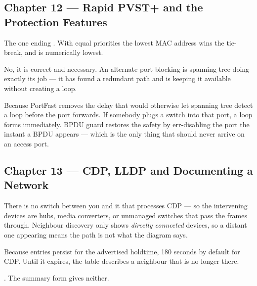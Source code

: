 \subsection*{Chapter 12 --- Rapid PVST+ and the Protection Features}
\begin{tightnum}
  \item The one ending . With equal priorities the lowest MAC address
        wins the tie-break, and  is numerically lowest.
  \item No, it is correct and necessary. An alternate port blocking is spanning
        tree doing exactly its job --- it has found a redundant path and is
        keeping it available without creating a loop.
  \item Because PortFast removes the delay that would otherwise let spanning tree
        detect a loop before the port forwards. If somebody plugs a switch into
        that port, a loop forms immediately. BPDU guard restores the safety by
        err-disabling the port the instant a BPDU appears --- which is the only
        thing that should never arrive on an access port.
\end{tightnum}

\subsection*{Chapter 13 --- CDP, LLDP and Documenting a Network}
\begin{tightnum}
  \item There is no switch between you and it that processes CDP --- so the
        intervening devices are hubs, media converters, or unmanaged switches
        that pass the frames through. Neighbour discovery only shows
        \emph{directly connected} devices, so a distant one appearing means the
        path is not what the diagram says.
  \item Because entries persist for the advertised holdtime, 180 seconds by
        default for CDP. Until it expires, the table describes a neighbour that
        is no longer there.
  \item {}. The summary form gives neither.
\end{tightnum}

